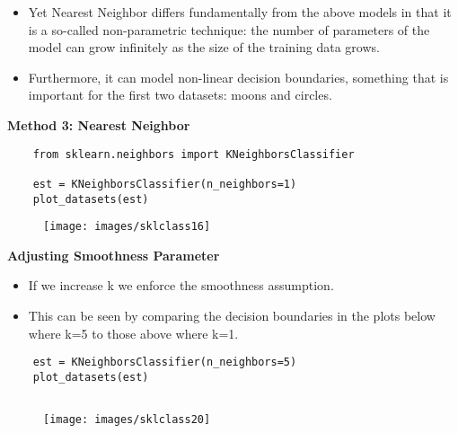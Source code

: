 \documentclass[SKL-MASTER.tex]{subfiles}
\begin{document}

	\begin{itemize}
\item 	Yet Nearest Neighbor differs fundamentally from the above models in that it is a so-called non-parametric technique: the number of parameters of the model can grow infinitely as the size of the training data grows. 
\item Furthermore, it can model non-linear decision boundaries, something that is important for the first two datasets: moons and circles.
	\end{itemize}
\newpage
\textbf{Method 3: Nearest Neighbor}
	\Large
\begin{framed}
		\begin{verbatim}
	from sklearn.neighbors import KNeighborsClassifier
	
	est = KNeighborsClassifier(n_neighbors=1)
	plot_datasets(est)
		\end{verbatim}
\end{framed}
\LARGE


	\begin{figure}[h!]
		\centering
		\texttt{[image: images/sklclass16]}
		
	\end{figure}

\newpage
\textbf{Adjusting Smoothness Parameter}
	\begin{itemize}
\item If we increase k we enforce the smoothness assumption. 
\item This can be seen by comparing the decision boundaries in the plots below where k=5 to those above where k=1.
	\end{itemize}

\begin{framed}
\begin{verbatim}
	est = KNeighborsClassifier(n_neighbors=5)
	plot_datasets(est)
	
	\end{verbatim}
	\end{framed}

\begin{figure}[h!]
\centering
\texttt{[image: images/sklclass20]}

\end{figure}


\end{document}
